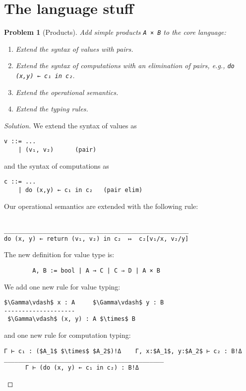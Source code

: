 \documentclass{article}
\newtheorem{problem}{Problem}[section]}
\begin{document}
    \section{The language stuff}
    \begin{problem}[Products]
        Add simple products \lstinline{A × B} to the core language:
        \begin{enumerate}
            \item Extend the syntax of values with pairs.
            \item Extend the syntax of computations with an elimination of pairs, e.g., \lstinline{do (x,y) ← c₁ in c₂}.
            \item Extend the operational semantics.
            \item Extend the typing rules.
        \end{enumerate}
    \end{problem}
    \begin{proof}[Solution]
        We extend the syntax of values as
        \begin{lstlisting}
v ::= ...
    | (v₁, v₂)      (pair)
        \end{lstlisting}
        and the syntax of computations as
        \begin{lstlisting}
c ::= ...
    | do (x,y) ← c₁ in c₂   (pair elim)
        \end{lstlisting}
        Our operational semantics are extended with the following rule:
        \begin{lstlisting}

____________________________________________________
do (x, y) ← return (v₁, v₂) in c₂  ↦  c₂[v₁/x, v₂/y]
        \end{lstlisting}
        The new definition for value type is:
        \begin{lstlisting}
        A, B := bool | A → C | C ⇒ D | A × B
        \end{lstlisting}
        We add one new rule for value typing:
        \begin{lstlisting}[mathescape=true]
$\Gamma\vdash$ x : A     $\Gamma\vdash$ y : B
--------------------
 $\Gamma\vdash$ (x, y) : A $\times$ B
        \end{lstlisting}
        and one new rule for computation typing:
        \begin{lstlisting}[mathescape=true]
Γ ⊢ c₁ : ($A_1$ $\times$ $A_2$)!Δ    Γ, x:$A_1$, y:$A_2$ ⊢ c₂ : B!Δ
_____________________________________________
      Γ ⊢ (do (x, y) ← c₁ in c₂) : B!Δ
        \end{lstlisting}
    \end{proof}
\end{document}
